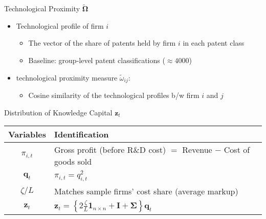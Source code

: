 \documentclass[
  10pt,               %
  aspectratio=169,     %
]{beamer}
\theoremstyle{plain}
\begin{document}
\begin{frame}{Technological Proximity $\widetilde{\bm{\Omega}}$}
  \begin{itemize}
    \item Technological profile of firm $i$
          \begin{itemize}
            \item The vector of the share of patents held by firm
                  $i$ in each patent class
            \item Baseline: group-level patent classifications ($\approx4000$)\medskip{}
          \end{itemize}
          \medskip{}
    \item \citet{Jaffe1986-yz} technological proximity measure $\tilde{\omega}_{ij}$:
          \begin{itemize}
            \item Cosine similarity of the technological profiles b/w firm $i$ and $j$
          \end{itemize}
  \end{itemize}
\end{frame}

\begin{frame}{Distribution of Knowledge Capital $\bm{z}_t$}
  \begin{table}[htbp]
    \centering
    \begin{tabular}{cl}
      \toprule
      Variables & Identification                                                        \\
      \midrule
      $\pi_{i,t}$
                & Gross profit (before R\&D cost)
      $=$ Revenue $-$ Cost of goods sold                                                \\[6pt]
      $\bm{q}_t$
                &
      $\pi_{i,t}=q_{i,t}^2$                                                             \\[6pt]
      $\zeta/L$
                & Matches sample firms' cost share (average markup)                     \\[6pt]
      $\bm{z}_t$
                &
      $\displaystyle \bm{z}_{t}
      =\left\{2\frac{\zeta}{L}\bm{1}_{n \times n}+\bm{I}+\bm{\Sigma}\right\}\bm{q}_{t}$ \\
      \bottomrule
    \end{tabular}
  \end{table}
\end{frame}
\end{document}
